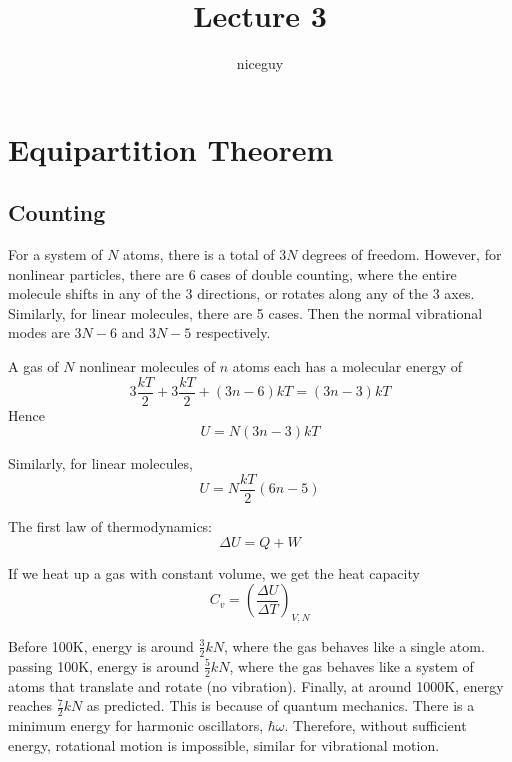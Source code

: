 \documentclass[12pt]{article}
\author{niceguy}
\title{Lecture 3}
\begin{document}
\maketitle

\section{Equipartition Theorem}

\subsection{Counting}

For a system of $N$ atoms, there is a total of $3N$ degrees of freedom. However, for nonlinear particles, there are 6 cases of double counting, where the entire molecule shifts in any of the 3 directions, or rotates along any of the 3 axes. Similarly, for linear molecules, there are 5 cases. Then the normal vibrational modes are $3N-6$ and $3N-5$ respectively.

A gas of $N$ nonlinear molecules of $n$ atoms each has a molecular energy of
$$3\frac{kT}{2} + 3\frac{kT}{2} + (3n-6)kT = (3n-3)kT$$
Hence
$$U = N(3n-3)kT$$

Similarly, for linear molecules,
$$U = N\frac{kT}{2}(6n-5)$$

The first law of thermodynamics:
$$\Delta U = Q + W$$

If we heat up a gas with constant volume, we get the heat capacity
$$C_v = \left(\frac{\Delta U}{\Delta T}\right)_{V,N}$$

Before 100K, energy is around $\frac{3}{2}kN$, where the gas behaves like a single atom. passing 100K, energy is around $\frac{5}{2}kN$, where the gas behaves like a system of atoms that translate and rotate (no vibration). Finally, at around 1000K, energy reaches $\frac{7}{2}kN$ as predicted. This is because of quantum mechanics. There is a minimum energy for harmonic oscillators, $\hbar\omega$. Therefore, without sufficient energy, rotational motion is impossible, similar for vibrational motion.
\end{document}
